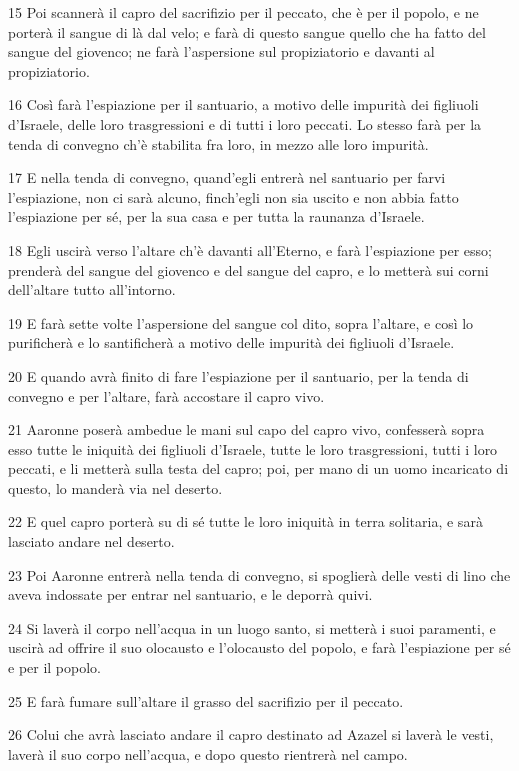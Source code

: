 \par 15 Poi scannerà il capro del sacrifizio per il peccato, che è per il popolo, e ne porterà il sangue di là dal velo; e farà di questo sangue quello che ha fatto del sangue del giovenco; ne farà l'aspersione sul propiziatorio e davanti al propiziatorio.
\par 16 Così farà l'espiazione per il santuario, a motivo delle impurità dei figliuoli d'Israele, delle loro trasgressioni e di tutti i loro peccati. Lo stesso farà per la tenda di convegno ch'è stabilita fra loro, in mezzo alle loro impurità.
\par 17 E nella tenda di convegno, quand'egli entrerà nel santuario per farvi l'espiazione, non ci sarà alcuno, finch'egli non sia uscito e non abbia fatto l'espiazione per sé, per la sua casa e per tutta la raunanza d'Israele.
\par 18 Egli uscirà verso l'altare ch'è davanti all'Eterno, e farà l'espiazione per esso; prenderà del sangue del giovenco e del sangue del capro, e lo metterà sui corni dell'altare tutto all'intorno.
\par 19 E farà sette volte l'aspersione del sangue col dito, sopra l'altare, e così lo purificherà e lo santificherà a motivo delle impurità dei figliuoli d'Israele.
\par 20 E quando avrà finito di fare l'espiazione per il santuario, per la tenda di convegno e per l'altare, farà accostare il capro vivo.
\par 21 Aaronne poserà ambedue le mani sul capo del capro vivo, confesserà sopra esso tutte le iniquità dei figliuoli d'Israele, tutte le loro trasgressioni, tutti i loro peccati, e li metterà sulla testa del capro; poi, per mano di un uomo incaricato di questo, lo manderà via nel deserto.
\par 22 E quel capro porterà su di sé tutte le loro iniquità in terra solitaria, e sarà lasciato andare nel deserto.
\par 23 Poi Aaronne entrerà nella tenda di convegno, si spoglierà delle vesti di lino che aveva indossate per entrar nel santuario, e le deporrà quivi.
\par 24 Si laverà il corpo nell'acqua in un luogo santo, si metterà i suoi paramenti, e uscirà ad offrire il suo olocausto e l'olocausto del popolo, e farà l'espiazione per sé e per il popolo.
\par 25 E farà fumare sull'altare il grasso del sacrifizio per il peccato.
\par 26 Colui che avrà lasciato andare il capro destinato ad Azazel si laverà le vesti, laverà il suo corpo nell'acqua, e dopo questo rientrerà nel campo.
